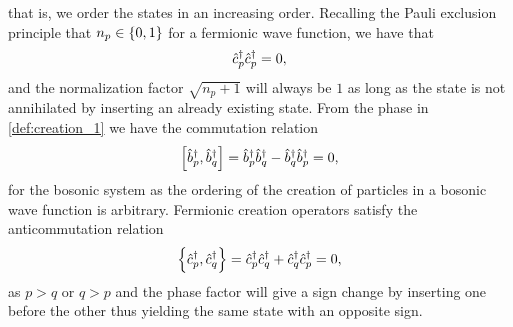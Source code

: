             that is, we order the states in an increasing order.
            Recalling the Pauli exclusion principle that $n_p \in \left\{ 0, 1 \right\}$
            for a fermionic wave function, we have that
            \begin{align}
                \hat{c}_{p}^{\dagger}\hat{c}_{p}^{\dagger} = 0,
            \end{align}
            and the normalization factor $\sqrt{n_p + 1}$ will always be $1$ as
            long as the state is not annihilated by inserting an already
            existing state.
            From the phase in \autoref{def:creation_1} we have the commutation
            relation
            \begin{gather}
                \left[\hat{b}_{p}^{\dagger}, \hat{b}_{q}^{\dagger}\right] = \hat{b}_{p}^{\dagger}\hat{b}_{q}^{\dagger} - \hat{b}_{q}^{\dagger}\hat{b}_{p}^{\dagger} = 0,
            \end{gather}
            for the bosonic system as the ordering of the creation of particles
            in a bosonic wave function is arbitrary.
            Fermionic creation operators satisfy the anticommutation relation
            \begin{gather}
                \left\{\hat{c}_{p}^{\dagger}, \hat{c}_{q}^{\dagger}\right\} = \hat{c}_{p}^{\dagger}\hat{c}_{q}^{\dagger} + \hat{c}_{q}^{\dagger}\hat{c}_{p}^{\dagger} = 0,
            \end{gather}
            as $p > q$ or $q > p$ and the phase factor will give a sign change
            by inserting one before the other thus yielding the same state with
            an opposite sign.

